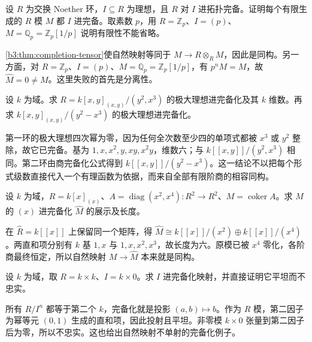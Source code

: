 \begin{exercise}\label{b3:ex:13-complete-finite-module}
	设 \(R\) 为交换 Noether 环，\(I\subseteq R\) 为理想，且 \(R\) 对 \(I\) 进拓扑完备。证明每个有限生成的 \(R\) 模 \(M\) 都 \(I\) 进完备。取素数 \(p\)，用 \(R=\mathbb Z_p\)、\(I=(p)\)、\(M=\mathbb Q_p=\mathbb Z_p[1/p]\) 说明有限性不能省略。
\end{exercise}
\begin{solution}
	\cref{b3:thm:completion-tensor}使自然映射等同于 \(M\rightarrow R\otimes_RM\)，因此是同构。另一方面，对 \(R=\mathbb Z_p\)、\(I=(p)\)、\(M=\mathbb Q_p=\mathbb Z_p[1/p]\)，有 \(p^nM=M\)，故 \(\widehat M=0\ne M\)。这里失败的首先是分离性。
\end{solution}

\begin{exercise}\label{b3:ex:13-completed-quotient}
	设 \(k\) 为域。求 \(R=k[x,y]_{(x,y)}/(y^2,x^3)\) 的极大理想进完备化及其 \(k\) 维数。再求 \(k[x,y]_{(x,y)}/(y^2-x^3)\) 的极大理想进完备化。
\end{exercise}
\begin{solution}
	第一环的极大理想四次幂为零，因为任何全次数至少四的单项式都被 \(x^3\) 或 \(y^2\) 整除，故它已完备。基为 \(1,x,x^2,y,xy,x^2y\)，维数六；与 \(k[\![x,y]\!]/(y^2,x^3)\) 相同。第二环由商完备化公式得到 \(k[\![x,y]\!]/(y^2-x^3)\)。这一结论不以把每个形式级数直接代入一个有理函数为依据，而来自全部有限阶商的相容同构。
\end{solution}

\begin{exercise}\label{b3:ex:13-completed-presentation}
	设 \(k\) 为域，\(R=k[x]_{(x)}\)、\(A=\operatorname{diag}(x^2,x^4):R^2\rightarrow R^2\)、\(M=\operatorname{coker}A\)。求 \(M\) 的 \((x)\) 进完备化 \(\widehat M\) 的展示及长度。
\end{exercise}
\begin{solution}
	在 \(\widehat R=k[\![x]\!]\) 上保留同一个矩阵，得 \(\widehat M\cong k[\![x]\!]/(x^2)\oplus k[\![x]\!]/(x^4)\)。两直和项分别有 \(k\) 基 \(1,x\) 与 \(1,x,x^2,x^3\)，故长度为六。原模已被 \(x^4\) 零化，各阶商最终恒定，所以自然映射 \(M\rightarrow\widehat M\) 本来就是同构。
\end{solution}

\begin{exercise}\label{b3:ex:13-idempotent-completion}
	设 \(k\) 为域，取 \(R=k\times k\)、\(I=k\times0\)。求 \(I\) 进完备化映射，并直接证明它平坦而不忠实。
\end{exercise}
\begin{solution}
	所有 \(R/I^n\) 都等于第二个 \(k\)，完备化就是投影 \((a,b)\mapsto b\)。作为 \(R\) 模，第二因子为幂等元 \((0,1)\) 生成的直和项，因此投射且平坦。非零模 \(k\times0\) 张量到第二因子后为零，所以不忠实。这也给出自然映射不单射的完备化例子。
\end{solution}

